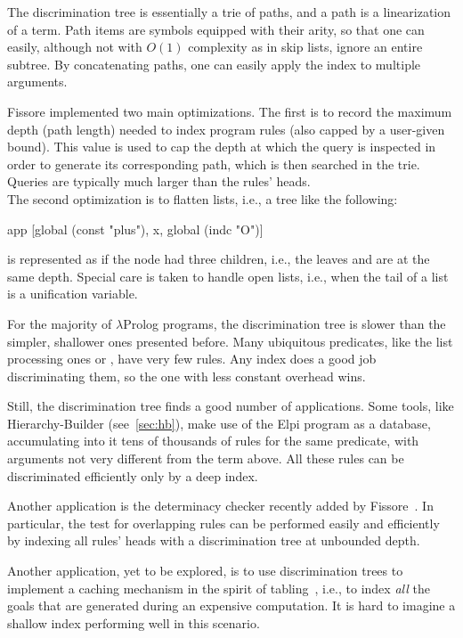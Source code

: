 \documentclass[a4paper, 11pt]{book}
\begin{document}
The discrimination tree is essentially a trie of paths, and a path is a
linearization of a term. Path items are symbols equipped with their arity, so
that one can easily, although not with $O(1)$ complexity as in skip lists,
ignore an entire subtree. By concatenating paths, one can easily apply the
index to multiple arguments.


Fissore implemented two main optimizations. The first is to record the maximum
depth (path length) needed to index program rules (also capped by a user-given
bound). This value is used to cap the depth at which the query is inspected in
order to generate its corresponding path, which is then searched in the trie.
Queries are typically much larger than the rules' heads.\\
The second optimization is to flatten lists, i.e., a tree like the following:
\begin{elpicode}
app [global (const "plus"), x, global (indc "O")]
\end{elpicode}
\noindent
is represented as if the  node had three children, i.e., the leaves
 and  are at the same depth. Special care is taken to
handle open lists, i.e., when the tail of a list is a unification variable.


For the majority of $\lambda$Prolog programs, the discrimination tree is
slower than the simpler, shallower ones presented before. Many ubiquitous
predicates, like the list processing ones  or , have very
few rules. Any index does a good job discriminating them, so the one with less
constant overhead wins.


Still, the discrimination tree finds a good number of applications. Some tools,
like Hierarchy-Builder (see~\cref{sec:hb}), make use of the Elpi program as a
database, accumulating into it tens of thousands of rules for the same
predicate, with arguments not very different from the term above. All these
rules can be discriminated efficiently only by a deep index.


Another application is the determinacy checker recently added by
Fissore~\cite{elpidet}. In particular, the test for overlapping rules can be
performed easily and efficiently by indexing all rules' heads with a
discrimination tree at unbounded depth.


Another application, yet to be explored, is to use discrimination trees to
implement a caching mechanism in the spirit of tabling~\cite{10.1145/191839.191927,10.1007/11532231_5,selsam2020tabledtypeclassresolution}, i.e., to index
\emph{all} the goals that are generated during an expensive computation. It is
hard to imagine a shallow index performing well in this scenario.
\end{document}
